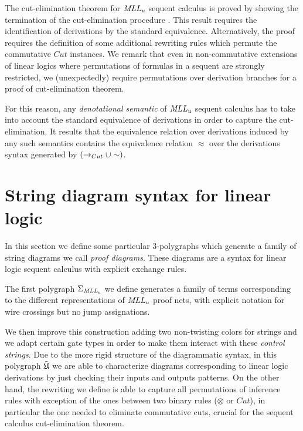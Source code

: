 \documentclass[a4paper]{article}
\begin{document}
The cut-elimination theorem for $\mathit{MLL_u}$ sequent calculus is proved  by showing the termination of the cut-elimination procedure \cite{girll}. This result requires the identification of derivations by the standard equivalence. Alternatively, the proof requires the definition of some additional rewriting rules which permute the commutative $Cut$ instances. 
We remark that even in non-commutative extensions of linear logics \cite{AbruNon} where permutations of formulas in a sequent are strongly restricted,  we (unexpectedly) require permutations over derivation branches for a proof of cut-elimination theorem. 

For this reason, any \emph{denotational semantic} of $\mathit{MLL_u}$ sequent calculus \cite{girss,Mel,Lollo} has to take into account the standard equivalence of derivations in order to capture the cut-elimination. It results that the equivalence relation over derivations  induced by any such semantics contains the equivalence relation $\approx$ over the derivations syntax generated by $(\rightarrow_{Cut}\cup \sim)$.



\section{String diagram syntax for linear logic}

In this section we define some particular $3$-polygraphs which generate a family of string diagrams we call \emph{proof diagrams}. These  diagrams are a syntax for  linear logic sequent calculus with explicit exchange rules.

The first polygraph $\Sigma_{\mathit{MLL_u}}$ we define generates a family of terms corresponding to the different representations of $\mathit{MLL_u}$ proof nets, with explicit notation for wire crossings but no jump assignations. 

We then improve this construction adding two non-twisting colors for strings and we adapt certain gate types in order to make them interact with these \emph{control strings}. Due to the more rigid structure of the diagrammatic syntax, in this polygraph ${\tilde{\mathfrak{U}}}$ we are able to characterize diagrams corresponding to linear logic derivations by just checking their inputs and outputs patterns. On the other hand, the rewriting we define is able to capture all permutations of inference rules with exception of the ones between two binary rules ($\otimes$ or $Cut$), in particular the one needed to eliminate commutative cuts, crucial for the sequent calculus cut-elimination theorem.
\end{document}
